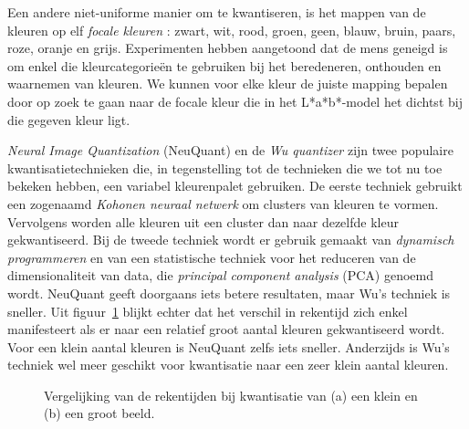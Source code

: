 Een andere niet-uniforme manier om te kwantiseren, is het mappen van de kleuren op elf 
\emph{focale kleuren} \cite{van_den_broek:human_color_categorization_for_cbir}: zwart, wit, rood, groen, geen, blauw, bruin, paars, roze, oranje en grijs.
Experimenten hebben aangetoond dat de mens geneigd is om enkel die kleurcategorie\"en te gebruiken bij 
het beredeneren, onthouden en waarnemen van kleuren. We kunnen voor elke kleur de juiste mapping bepalen
door op zoek te gaan naar de focale kleur die in het L*a*b*-model het dichtst bij die gegeven kleur ligt.

\emph{Neural Image Quantization} (NeuQuant) \cite{dekker:neuquant} en de \emph{Wu quantizer} 
\cite{wu:color_quantization_by_dynamic_programming_and_principal_analysis} zijn twee
populaire kwantisatietechnieken die, in tegenstelling tot de technieken die we 
tot nu toe bekeken hebben, een variabel kleurenpalet gebruiken. De eerste techniek gebruikt een
zogenaamd \emph{Kohonen neuraal netwerk} om clusters van kleuren te vormen. Vervolgens worden 
alle kleuren uit een cluster dan naar dezelfde kleur gekwantiseerd. Bij de tweede techniek 
wordt er gebruik gemaakt van \emph{dynamisch programmeren} en van een statistische techniek voor 
het reduceren van de dimensionaliteit van data, 
die \emph{principal component analysis} (PCA) genoemd wordt. 
NeuQuant geeft doorgaans iets betere resultaten, maar Wu's techniek is
sneller. Uit figuur~\ref{fig:rekentijden_quant} blijkt echter dat het verschil in rekentijd zich
enkel manifesteert als er naar een relatief groot aantal kleuren gekwantiseerd wordt. Voor een
klein aantal kleuren is NeuQuant zelfs iets sneller. Anderzijds is Wu's techniek wel meer
geschikt voor kwantisatie naar een zeer klein aantal kleuren.
 

\begin{figure}[tbp]
\begin{center}
\caption{\label{fig:rekentijden_quant}Vergelijking van de rekentijden bij kwantisatie van (a) een klein en (b) een groot beeld.}
\end{center}
\end{figure}

